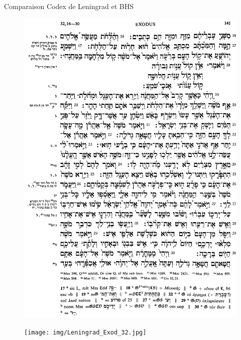 \documentclass[11pt]{beamer}
\begin{document}
\begin{frame}{Comparaison Codex de Leningrad et BHS}

\begin{figure}[h]
    \begin{minipage}[c]{.46\linewidth}
        \centering            \includegraphics[width=1\linewidth]{img/BHS_Exod_32.png}
    \end{minipage}
    \hfill%
    \begin{minipage}[c]{.46\linewidth}
        \centering
        \texttt{[image: img/Leningrad\_Exod\_32.jpg]}
    \end{minipage}
\end{figure}

\end{frame}
\end{document}

